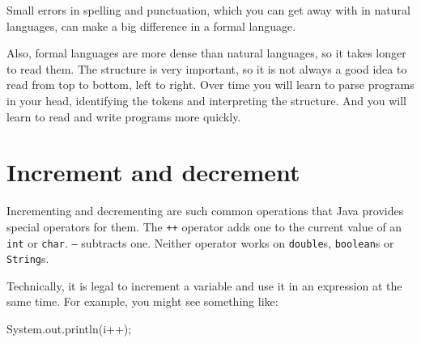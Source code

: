 






Small errors in spelling and punctuation, which you can get away with in natural languages, can make a big difference in a formal language.

Also, formal languages are more dense than natural languages, so it takes longer to read them.
The structure is very important, so it is not always a good idea to read from top to bottom, left to right.
Over time you will learn to parse programs in your head, identifying the tokens and interpreting the structure.
And you will learn to read and write programs more quickly.


\section{Increment and decrement}


Incrementing and decrementing are such common operations that Java provides special operators for them.
The {\tt ++} operator adds one to the current value of an {\tt int} or {\tt char}.
{\tt --} subtracts one.
Neither operator works on {\tt double}s, {\tt boolean}s or {\tt String}s.

Technically, it is legal to increment a variable and use it in an expression at the same time.
For example, you might see something like:

\begin{code}
    System.out.println(i++);
\end{code}

